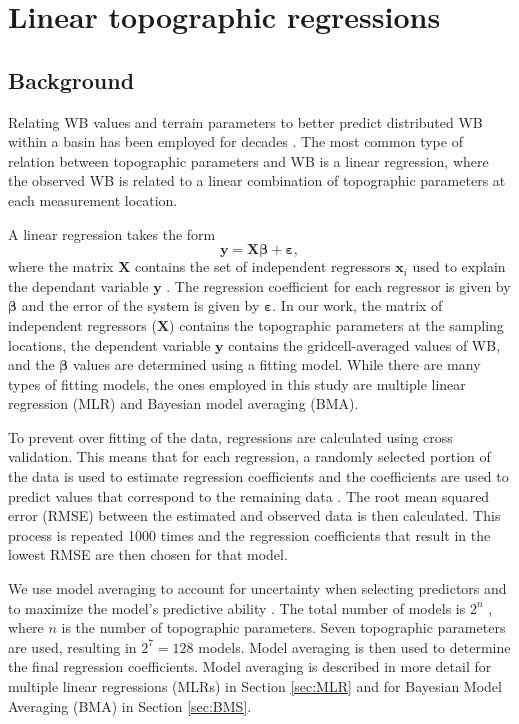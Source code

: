 \documentclass{sfuthesis}
\renewcommand{\vector}[1]{\mathbf{#1}}
\begin{document}
\section{Linear topographic regressions}
\label{sec:linearregression}

\subsection{Background}
Relating WB values and terrain parameters to better predict distributed WB within a basin has been employed for decades \citep[e.g.][]{Woo1978, Molotch2005, McGrath2015}. The most common type of relation between topographic parameters and WB is a linear regression, where the observed WB is related to a linear combination of topographic parameters at each measurement location. 

A linear regression takes the form
\begin{equation}
\vector{y} = \vector{X} \bm{\beta} + \bm{\varepsilon},
\end{equation}
where the matrix $\vector{X}$ contains the set of independent regressors $\vector{x}_i$ used to explain the dependant variable $\vector{y}$ \citep[e.g.][]{Davis1986}. The regression coefficient for each regressor is given by $\bm{\beta}$ and the error of the system is given by $\bm{\varepsilon}$. In our work, the matrix of independent regressors ($\vector{X}$) contains the topographic parameters at the sampling locations, the dependent variable $\vector{y}$ contains the gridcell-averaged values of WB, and the $\bm{\beta}$ values are determined using a fitting model. While there are many types of fitting models, the ones employed in this study are multiple linear regression (MLR) and Bayesian model averaging (BMA).

To prevent over fitting of the data, regressions are calculated using cross validation. This means that for each regression, a randomly selected portion of the data is used to estimate regression coefficients and the coefficients are used to predict values that correspond to the remaining data \citep{Kohavi1995}. The root mean squared error (RMSE) between the estimated and observed data is then calculated. This process is repeated 1000 times and the regression coefficients that result in the lowest RMSE are then chosen for that model. 

We use model averaging to account for uncertainty when selecting predictors and to maximize the model's predictive ability \citep{Madigan1994}. The total number of models is $2^n$ , where $n$ is the number of topographic parameters. Seven topographic parameters are used, resulting in $2^7 = 128$ models. Model averaging is then used to determine the final regression coefficients. Model averaging is described in more detail for multiple linear regressions (MLRs) in Section \ref{sec:MLR} and for Bayesian Model Averaging (BMA) in Section \ref{sec:BMS}.
\end{document}
